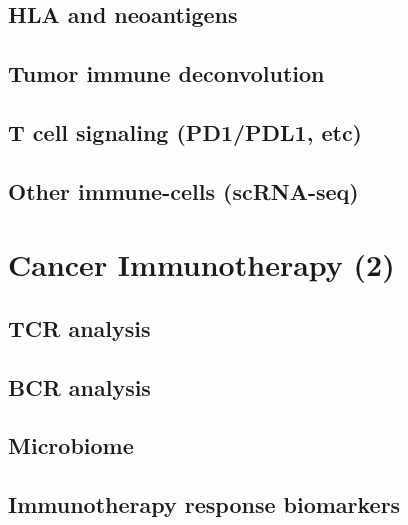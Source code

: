 \documentclass[
]{book}
\begin{document}
\hypertarget{hla-and-neoantigens}{%
\section{HLA and neoantigens}\label{hla-and-neoantigens}}

\hypertarget{tumor-immune-deconvolution}{%
\section{Tumor immune deconvolution}\label{tumor-immune-deconvolution}}

\hypertarget{t-cell-signaling-pd1pdl1-etc}{%
\section{T cell signaling (PD1/PDL1, etc)}\label{t-cell-signaling-pd1pdl1-etc}}

\hypertarget{other-immune-cells-scrna-seq}{%
\section{Other immune-cells (scRNA-seq)}\label{other-immune-cells-scrna-seq}}

\hypertarget{cancerimmuno2}{%
\chapter{Cancer Immunotherapy (2)}\label{cancerimmuno2}}

\hypertarget{tcr-analysis}{%
\section{TCR analysis}\label{tcr-analysis}}

\hypertarget{bcr-analysis}{%
\section{BCR analysis}\label{bcr-analysis}}

\hypertarget{microbiome}{%
\section{Microbiome}\label{microbiome}}

\hypertarget{immunotherapy-response-biomarkers}{%
\section{Immunotherapy response biomarkers}\label{immunotherapy-response-biomarkers}}
\end{document}
